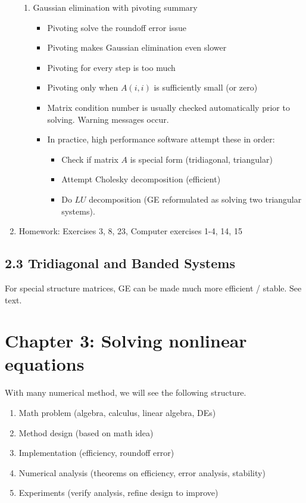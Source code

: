 \documentclass{article}
\theoremstyle{remark}
\begin{document}
\begin{enumerate}
\begin{enumerate}
\item Gaussian elimination with pivoting summary
\begin{itemize}
\item Pivoting solve the roundoff error issue
\item Pivoting makes Gaussian elimination even slower
\item Pivoting for every step is too much	
\item Pivoting only when $A(i,i)$ is sufficiently small (or zero)
\item Matrix condition number is usually checked automatically prior to solving. Warning messages occur.
\item In practice, high performance software attempt these in order:
\begin{itemize}
\item Check if matrix $A$ is special form (tridiagonal, triangular)
\item Attempt Cholesky decomposition (efficient)
\item Do $LU$ decomposition (GE reformulated as solving two triangular systems). 
\end{itemize}
\end{itemize}
\end{enumerate}

\item Homework: Exercises 3, 8, 23, Computer exercises 1-4, 14, 15
\end{enumerate}


\subsection{2.3 Tridiagonal and Banded Systems}

For special structure matrices, GE can be made much more efficient / stable. See text.

\section{Chapter 3: Solving nonlinear equations}

With many numerical method, we will see the following structure.
\begin{enumerate}
\item Math problem (algebra, calculus, linear algebra, DEs)
\item Method design (based on math idea)
\item Implementation (efficiency, roundoff error)
\item Numerical analysis (theorems on efficiency, error analysis, stability)
\item Experiments (verify analysis, refine design to improve)
\end{enumerate}
\end{document}
